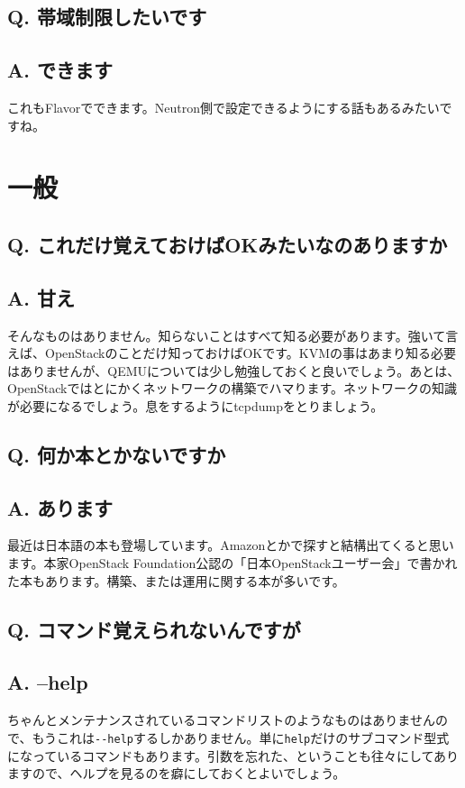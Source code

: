 \documentclass[9pt,b5paper,tombo,openany]{jsbook}
\begin{document}
\subsection*{{\LARGE\bfseries Q.} 帯域制限したいです}
\subsection*{{\LARGE\bfseries A.} できます}
これもFlavorでできます。Neutron側で設定できるようにする話もあるみたいですね。

\section{一般}

\subsection*{{\LARGE\bfseries Q.} これだけ覚えておけばOKみたいなのありますか}
\subsection*{{\LARGE\bfseries A.} 甘え}
そんなものはありません。知らないことはすべて知る必要があります。強いて言えば、OpenStackのことだけ知っておけばOKです。KVMの事はあまり知る必要はありませんが、QEMUについては少し勉強しておくと良いでしょう。あとは、OpenStackではとにかくネットワークの構築でハマります。ネットワークの知識が必要になるでしょう。息をするようにtcpdumpをとりましょう。

\subsection*{{\LARGE\bfseries Q.} 何か本とかないですか}
\subsection*{{\LARGE\bfseries A.} あります}
最近は日本語の本も登場しています。Amazonとかで探すと結構出てくると思います。本家OpenStack Foundation公認の「日本OpenStackユーザー会」で書かれた本もあります。構築、または運用に関する本が多いです。

\subsection*{{\LARGE\bfseries Q.} コマンド覚えられないんですが}
\subsection*{{\LARGE\bfseries A.} --help}
ちゃんとメンテナンスされているコマンドリストのようなものはありませんので、もうこれは\verb|--help|するしかありません。単に\verb|help|だけのサブコマンド型式になっているコマンドもあります。引数を忘れた、ということも往々にしてありますので、ヘルプを見るのを癖にしておくとよいでしょう。
\end{document}

